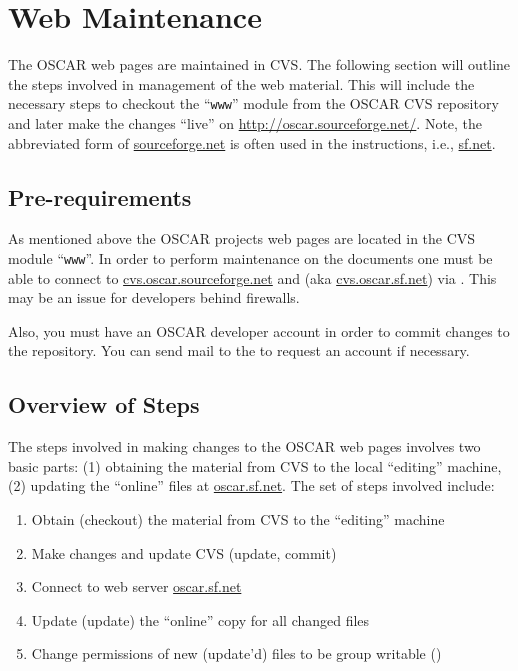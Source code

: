 %
%
%

\section{Web Maintenance}
\label{sec:www}

The OSCAR web pages are maintained in CVS.  The following section will
outline the steps involved in management of the web material.  This will
include the necessary steps to checkout the ``{\tt www}'' module from the
OSCAR CVS repository and later make the changes ``live'' on 
\url{http://oscar.sourceforge.net/}.   Note, the abbreviated form of
\url{sourceforge.net} is often used in the instructions, i.e., \url{sf.net}.


\subsection{Pre-requirements}

As mentioned above the OSCAR projects web pages are located in the CVS
module ``{\tt www}''.  In order to perform maintenance on the documents one
must be able to connect to \url{cvs.oscar.sourceforge.net} and (aka
\url{cvs.oscar.sf.net}) via .  This may be an issue for developers
behind firewalls. 

Also, you must have an OSCAR developer account in order to commit changes
to the repository.  You can send mail to the
 to request an account if
necessary.




\subsection{Overview of Steps}

The steps involved in making changes to the OSCAR web pages involves
two basic parts: (1) obtaining the material from CVS to the local
``editing'' machine, (2) updating the ``online'' files at
\url{oscar.sf.net}.  The set of steps involved include:

\begin{enumerate}
	\item Obtain (checkout) the material from CVS to the ``editing'' machine
	\item Make changes and update CVS (update, commit)
	\item Connect to web server \url{oscar.sf.net}
	\item Update (update) the ``online'' copy for all changed files
	\item Change permissions of new (update'd) files to be group writable
	()
\end{enumerate}



